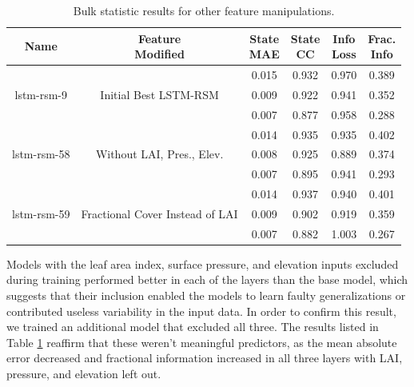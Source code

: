 \begin{table}[H]
    \centering
    \small
    \begin{tabular}{c|c|c|c|c|c }
        Name & \thead{Feature \\ Modified} &  \thead{State\\MAE} & \thead{State\\CC} & \thead{Info\\Loss} &\thead{Frac.\\Info}  \\
        \hline
        \multirow{3}{6em}{lstm-rsm-9} & \multirow{3}{8em}{Initial Best LSTM-RSM} & 0.015 & 0.932 & 0.970 & 0.389 \\ & & 0.009 & 0.922 & 0.941 & 0.352 \\ & & 0.007 & 0.877 & 0.958 & 0.288 \\
        \hline
        \multirow{3}{6em}{lstm-rsm-58} & \multirow{3}{8em}{Without LAI, Pres., Elev.} & 0.014 & 0.935 & 0.935 & 0.402 \\ & & 0.008 & 0.925 & 0.889 & 0.374 \\ & & 0.007 & 0.895 & 0.941 & 0.293 \\
        \hline
        \multirow{3}{6em}{lstm-rsm-59} & \multirow{3}{8em}{Fractional Cover Instead of LAI} & 0.014 & 0.937 & 0.940 & 0.401 \\ & & 0.009 & 0.902 & 0.919 & 0.359 \\ & & 0.007 & 0.882 & 1.003 & 0.267 \\
    \end{tabular}
    \caption{Bulk statistic results for other feature manipulations.}
    \label{feat-variants-table-2}
\end{table}

Models with the leaf area index, surface pressure, and elevation inputs excluded during training performed better in each of the layers than the base model, which suggests that their inclusion enabled the models to learn faulty generalizations or contributed useless variability in the input data. In order to confirm this result, we trained an additional model that excluded all three. The results listed in Table \ref{feat-variants-table-2} reaffirm that these weren't meaningful predictors, as the mean absolute error decreased and fractional information increased in all three layers with LAI, pressure, and elevation left out.

